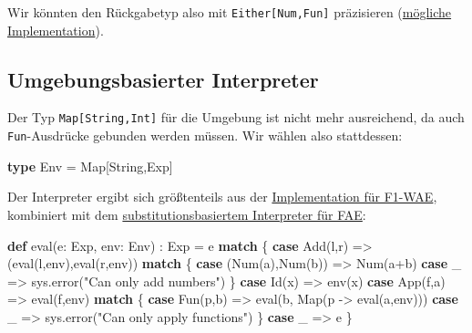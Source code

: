 \documentclass[]{article}
\newenvironment{Shaded}{}{}
\newcommand{\FunctionTok}[1]{\textcolor[rgb]{0.02,0.16,0.49}{#1}}
\newcommand{\KeywordTok}[1]{\textcolor[rgb]{0.00,0.44,0.13}{\textbf{#1}}}
\newcommand{\NormalTok}[1]{#1}
\newcommand{\StringTok}[1]{\textcolor[rgb]{0.25,0.44,0.63}{#1}}
\begin{document}
Wir könnten den Rückgabetyp also mit \texttt{Either{[}Num,Fun{]}}
präzisieren
(\href{https://github.com/DavidLaewen/programmiersprachen1/blob/main/additional-material/FAEWithEitherType.scala}{mögliche
Implementation}).

\hypertarget{umgebungsbasierter-interpreter-a}{%
\subsection{Umgebungsbasierter
Interpreter}\label{umgebungsbasierter-interpreter-a}}

Der Typ \texttt{Map{[}String,Int{]}} für die Umgebung ist nicht mehr
ausreichend, da auch \texttt{Fun}-Ausdrücke gebunden werden müssen. Wir
wählen also stattdessen:

\begin{Shaded}
\begin{Highlighting}[]
\KeywordTok{type}\NormalTok{ Env = Map[String,Exp]}
\end{Highlighting}
\end{Shaded}

Der Interpreter ergibt sich größtenteils aus der
\protect\hyperlink{umgebungsbasierter-interpreter}{Implementation für
F1-WAE}, kombiniert mit dem
\protect\hyperlink{substitutionsbasierter-interpreter-a}{substitutionsbasiertem
Interpreter für FAE}:

\begin{Shaded}
\begin{Highlighting}[]
\KeywordTok{def} \FunctionTok{eval}\NormalTok{(e: Exp, env: Env) : Exp = e }\KeywordTok{match}\NormalTok{ \{}
  \KeywordTok{case} \FunctionTok{Add}\NormalTok{(l,r) =\textgreater{} (}\FunctionTok{eval}\NormalTok{(l,env),}\FunctionTok{eval}\NormalTok{(r,env)) }\KeywordTok{match}\NormalTok{ \{}
    \KeywordTok{case}\NormalTok{ (}\FunctionTok{Num}\NormalTok{(a),}\FunctionTok{Num}\NormalTok{(b)) =\textgreater{} }\FunctionTok{Num}\NormalTok{(a+b)}
    \KeywordTok{case}\NormalTok{ \_ =\textgreater{} sys.}\FunctionTok{error}\NormalTok{(}\StringTok{"Can only add numbers"}\NormalTok{)}
\NormalTok{  \}}
  \KeywordTok{case} \FunctionTok{Id}\NormalTok{(x) =\textgreater{} }\FunctionTok{env}\NormalTok{(x)}
  \KeywordTok{case} \FunctionTok{App}\NormalTok{(f,a) =\textgreater{} }\FunctionTok{eval}\NormalTok{(f,env) }\KeywordTok{match}\NormalTok{ \{}
    \KeywordTok{case} \FunctionTok{Fun}\NormalTok{(p,b) =\textgreater{}}
      \FunctionTok{eval}\NormalTok{(b, Map(p {-}\textgreater{} }\FunctionTok{eval}\NormalTok{(a,env)))}
    \KeywordTok{case}\NormalTok{ \_ =\textgreater{} sys.}\FunctionTok{error}\NormalTok{(}\StringTok{"Can only apply functions"}\NormalTok{)}
\NormalTok{  \}}
  \KeywordTok{case}\NormalTok{ \_ =\textgreater{} e}
\NormalTok{\}}
\end{Highlighting}
\end{Shaded}
\end{document}
